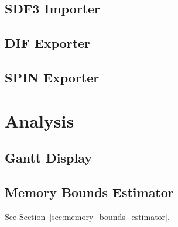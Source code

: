 \documentclass[10pt,letterpaper]{report}
\begin{document}
	\subsection{SDF3 Importer}
	\subsection{DIF Exporter}
	\subsection{SPIN Exporter}
	
	\section{Analysis}
	\subsection{Gantt Display}
	\subsection{Memory Bounds Estimator}
	See Section~\ref{sec:memory_bounds_estimator}.

	
	
\end{document}
